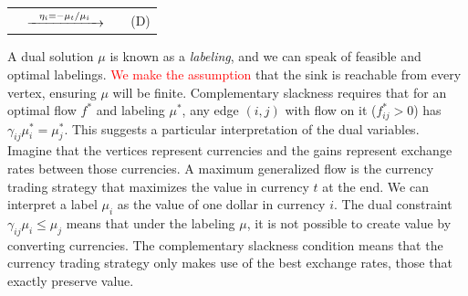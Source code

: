 \documentclass[11pt]{article}
\theoremstyle{definition}
\theoremstyle{definition}
\newcommand{\R}{\mathbb{R}}
\newcommand{\gij}{\gamma_{ij}}
\newcommand{\rewrite}[1]{\textcolor{red}{#1}}
\begin{document}
	\begin{tabular}{rcll}
		\hspace*{-1.05cm}
	\resizebox{0.37\textwidth}{!}{
		\fbox{
	\begin{minipage}{0.35\textwidth}
	\begin{alignat*}{3}
    \text{min} &\quad &\sum_{i \in V \setminus t} b_i \eta_i \\
    \text{s.t.}
    &   &\gij \eta_j - \eta_i &\geq 0 \quad &&\forall\; (i, j) \in E[V \setminus t] \\
    &   &\gamma_{ti} \eta_i &= -1 \quad     &&\forall\; (i, t) \in E \\
    &   &\eta_i &= -\gamma_{it} \quad       &&\forall\; (t, i) \in E \\
    &   &\eta_i &\leq 0 \quad               &&\forall\; i \in V \setminus t
    \end{alignat*}
	\end{minipage}
}
} & 
	$\xrightarrow{\hspace*{0.25cm}\eta_i = - \mu_t / \mu_i\hspace*{0.25cm}}$
	&
	\resizebox{0.37\textwidth}{!}{
		\fbox{
	\begin{minipage}{0.4\textwidth}
    \begin{alignat*}{3}
    \text{max} &\quad &\mu_t &\sum_{j \in V \setminus t} \frac{b_j}{\mu_j}  \\
    \text{s.t.}
    &   &\gij \mu_i &\leq \mu_j \quad &&\forall\; (i, j) \in E \\
    &   &\mu_i &\in \R_{>0} \cup \infty \quad &&\forall\; i \in V \setminus t \\
    &   &\mu_t &\in \R_{>0}
    \end{alignat*}
	\end{minipage}
}
} & \hspace*{0.4cm}(D)
\end{tabular}
\vspace{0.5cm}

        
	A dual solution $\mu$ is known as a \emph{labeling}, and we can speak of feasible and
	optimal labelings. \rewrite{We make the assumption} that the sink is reachable from every vertex, ensuring $\mu$ will be finite.
	Complementary slackness requires that for an optimal flow $f^*$ and labeling $\mu^*$,
	any edge $(i, j)$ with flow on it ($f^*_{ij} > 0$) has $\gamma_{ij}\mu^*_i = \mu^*_j$.
	This suggests a particular interpretation of the dual variables. Imagine that
	the vertices represent currencies and the gains represent exchange rates between those currencies.
	A maximum generalized flow is the currency trading strategy that maximizes the value in currency
	$t$ at the end. We can interpret a label $\mu_i$ as the value of one dollar in currency $i$.
	The dual constraint $\gamma_{ij} \mu_i \leq \mu_j$ means that under the labeling $\mu$,
	it is not possible to create value by converting currencies.
	The complementary slackness condition means that the currency trading strategy
	only makes use of the best exchange rates, those that exactly preserve value.
	
\end{document}
